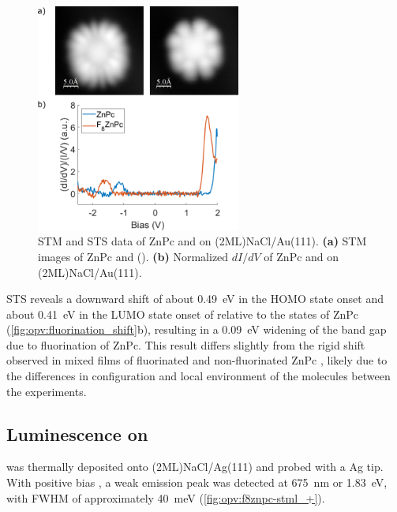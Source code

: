\begin{figure} [H]
    \centering
        \includegraphics[width=0.6\textwidth]{pictures/znpc_f8znpc_comparison.png}
    \caption{ STM and STS data of ZnPc and  on (2ML)NaCl/Au(111). \textbf{(a)} STM images of ZnPc and  (). \textbf{(b)} Normalized $dI/dV$ of ZnPc and  on (2ML)NaCl/Au(111).  }
    \label{fig:opv:fluorination_shift}
\end{figure}

\ac{STS} reveals a downward shift of about \SI{0.49}{eV} in the HOMO state onset and about \SI{0.41}{eV} in the LUMO state onset of  relative to the states of ZnPc (\autoref{fig:opv:fluorination_shift}b), resulting in a \SI{0.09}{eV} widening of the band gap due to fluorination of ZnPc. This result differs slightly from the rigid shift observed in mixed films of fluorinated and non-fluorinated ZnPc \citep{schwarze2016band}, likely due to the differences in configuration and local environment of the molecules between the experiments.


\subsection{Luminescence on }

 was thermally deposited onto (2ML)NaCl/Ag(111) and probed with a Ag tip. With positive bias , a weak emission peak was detected at \SI{675}{nm} or \SI{1.83}{eV}, with FWHM of approximately \SI{40}{meV} (\autoref{fig:opv:f8znpc-stml_+}). 

